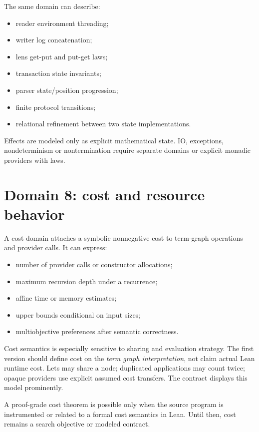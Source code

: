 \documentclass[11pt,oneside]{report}
\begin{document}
The same domain can describe:

\begin{itemize}[leftmargin=2em]
\item reader environment threading;
\item writer log concatenation;
\item lens get-put and put-get laws;
\item transaction state invariants;
\item parser state/position progression;
\item finite protocol transitions;
\item relational refinement between two state implementations.
\end{itemize}

Effects are modeled only as explicit mathematical state. IO, exceptions, nondeterminism or nontermination require separate domains or explicit monadic providers with laws.

\section{Domain 8: cost and resource behavior}
\label{sec:domain-cost}

A cost domain attaches a symbolic nonnegative cost to term-graph operations and provider calls. It can express:

\begin{itemize}[leftmargin=2em]
\item number of provider calls or constructor allocations;
\item maximum recursion depth under a recurrence;
\item affine time or memory estimates;
\item upper bounds conditional on input sizes;
\item multiobjective preferences after semantic correctness.
\end{itemize}

Cost semantics is especially sensitive to sharing and evaluation strategy. The first version should define cost on the \emph{term graph interpretation}, not claim actual Lean runtime cost. Lets may share a node; duplicated applications may count twice; opaque providers use explicit assumed cost transfers. The contract displays this model prominently.

A proof-grade cost theorem is possible only when the source program is instrumented or related to a formal cost semantics in Lean. Until then, cost remains a search objective or modeled contract.
\end{document}
